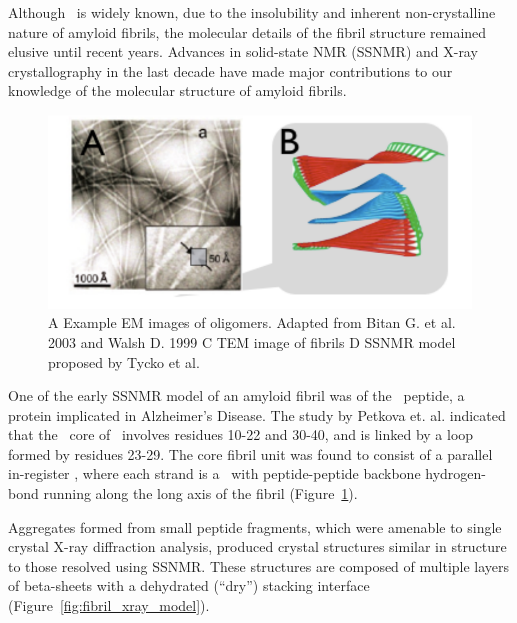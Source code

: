 
Although \crossb\ is widely known, due to the insolubility and inherent non-crystalline nature of amyloid fibrils, the molecular details of the fibril structure remained elusive until recent years. Advances in solid-state NMR (SSNMR) and X-ray crystallography in the last decade have made major contributions to our knowledge of the molecular structure of amyloid fibrils.

\begin{figure}
  \centering
  \includegraphics[width=6in]{figures/introduction/fibril_TEM_SSNMR.pdf}
  \caption[Characteristic cross-$\beta$ spacings from X-ray fibre diffraction studies of amyloid fibrils]{A Example EM images of oligomers.  Adapted from Bitan G. et al. 2003 and Walsh D. 1999 C TEM image of fibrils D SSNMR model proposed by Tycko et al.}
  \label{fig:fibril_TEM_SSNMR}
\end{figure}


One of the early SSNMR model of an amyloid fibril was of the \ peptide, a protein implicated in Alzheimer's Disease.  The study by Petkova et. al.\cite{Petkova:2006gx} indicated that the \bsheet\ core of \ involves residues 10-22 and 30-40, and is linked by a loop formed by residues 23-29. The core fibril unit was found to consist of a parallel in-register \bsheet, where each strand is a \bhairpin\ with peptide-peptide backbone hydrogen-bond running along the long axis of the fibril (Figure~\ref{fig:fibril_TEM_SSNMR}).

Aggregates formed from small peptide fragments, which were amenable to single crystal X-ray diffraction analysis, produced crystal structures similar in structure to those resolved using SSNMR. These structures are composed of multiple layers of beta-sheets with a dehydrated (``dry'') stacking interface (Figure~\ref{fig:fibril_xray_model}).

